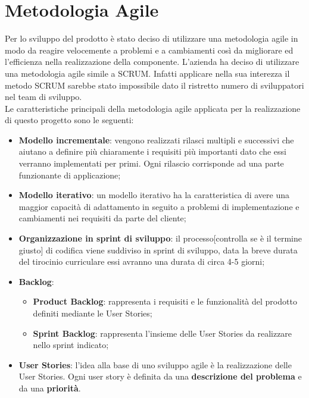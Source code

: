 \section{Metodologia Agile}
Per lo sviluppo del prodotto è stato deciso di utilizzare una metodologia agile in modo da reagire velocemente a problemi e a cambiamenti così da migliorare ed l'efficienza nella realizzazione della componente. L'azienda ha deciso di utilizzare una metodologia agile simile a SCRUM. Infatti applicare nella sua interezza il metodo SCRUM sarebbe stato impossibile dato il ristretto numero di sviluppatori nel team di sviluppo. \\
Le caratteristiche principali della metodologia agile applicata per la realizzazione di questo progetto sono le seguenti:
\begin{itemize}
	\item \textbf{Modello incrementale}: vengono realizzati rilasci multipli e successivi che aiutano a definire più chiaramente i requisiti più importanti dato che essi verranno implementati per primi. Ogni rilascio corrisponde ad una parte funzionante di applicazione;
	
	\item \textbf{Modello iterativo}: un modello iterativo ha la caratteristica di avere una maggior capacità di adattamento in seguito a problemi di implementazione e cambiamenti nei requisiti da parte del cliente;
	
	\item \textbf{Organizzazione in sprint di sviluppo}: il processo[controlla se è il termine giusto] di codifica viene suddiviso in sprint di sviluppo, data la breve durata del tirocinio curriculare essi avranno una durata di circa 4-5 giorni;
	
	\item \textbf{Backlog}: 
		\begin{itemize}
			\item \textbf{Product Backlog}: rappresenta i requisiti e le funzionalità del prodotto definiti mediante le User Stories;
			\item \textbf{Sprint Backlog}: rappresenta l'insieme delle User Stories da realizzare nello sprint indicato;
		\end{itemize}
	
	\item \textbf{User Stories}: l'idea alla base di uno sviluppo agile è la realizzazione delle User Stories. Ogni user story è definita da una \textbf{descrizione del problema} e da una \textbf{priorità}.
	

\end{itemize}
